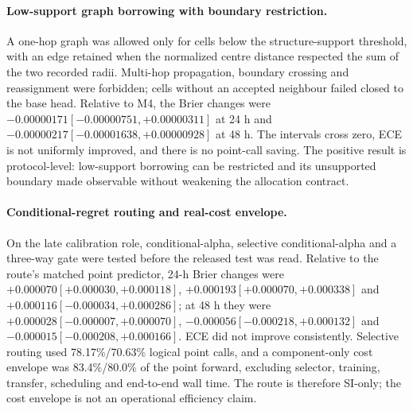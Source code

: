 \documentclass[11pt,a4paper]{article}
\numberwithin{equation}{section}
\theoremstyle{definition}\newtheorem{definition}[theorem]{Definition}
\theoremstyle{remark}\newtheorem{remark}[theorem]{Remark}
\begin{document}
\paragraph{Low-support graph borrowing with boundary restriction.}
A one-hop graph was allowed only for cells below the structure-support threshold, with an edge retained when the normalized centre distance respected the sum of the two recorded radii. Multi-hop propagation, boundary crossing and reassignment were forbidden; cells without an accepted neighbour failed closed to the base head. Relative to M4, the Brier changes were $-0.00000171[-0.00000751,+0.00000311]$ at 24 h and $-0.00000217[-0.00001638,+0.00000928]$ at 48 h. The intervals cross zero, ECE is not uniformly improved, and there is no point-call saving. The positive result is protocol-level: low-support borrowing can be restricted and its unsupported boundary made observable without weakening the allocation contract.

\paragraph{Conditional-regret routing and real-cost envelope.}
On the late calibration role, conditional-alpha, selective conditional-alpha and a three-way gate were tested before the released test was read. Relative to the route's matched point predictor, 24-h Brier changes were $+0.000070[+0.000030,+0.000118]$, $+0.000193[+0.000070,+0.000338]$ and $+0.000116[-0.000034,+0.000286]$; at 48 h they were $+0.000028[-0.000007,+0.000070]$, $-0.000056[-0.000218,+0.000132]$ and $-0.000015[-0.000208,+0.000166]$. ECE did not improve consistently. Selective routing used 78.17\%/70.63\% logical point calls, and a component-only cost envelope was 83.4\%/80.0\% of the point forward, excluding selector, training, transfer, scheduling and end-to-end wall time. The route is therefore SI-only; the cost envelope is not an operational efficiency claim.
\end{document}
